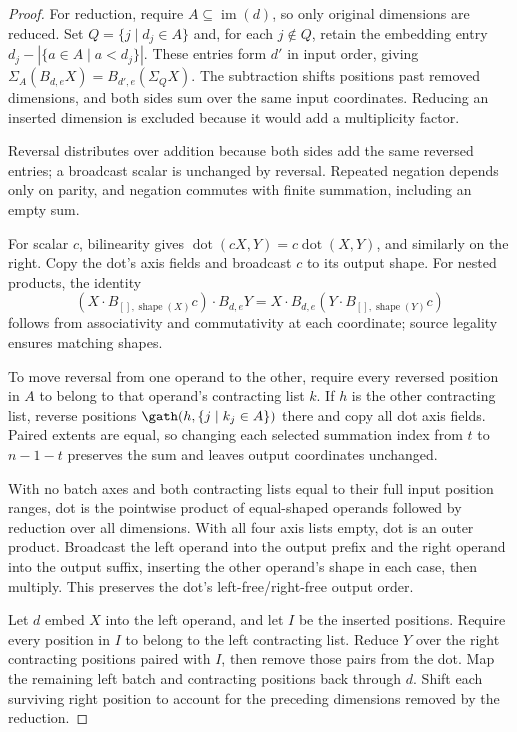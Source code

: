 \begin{proof}
For reduction, require $A\subseteq\operatorname{im}(d)$, so only original
dimensions are reduced. Set $Q=\{j\mid d_j\in A\}$ and, for
each $j\notin Q$, retain the embedding entry
$d_j-|\{a\in A\mid a<d_j\}|$. These entries form $d'$ in input order,
giving $\Sigma_A(B_{d,e}X)=B_{d',e}(\Sigma_QX)$.
The subtraction shifts positions past removed dimensions, and both sides
sum over the same input coordinates. Reducing an inserted dimension is
excluded because it would add a multiplicity factor.

Reversal distributes over addition because both sides add the same
reversed entries; a broadcast scalar is unchanged by reversal.
Repeated negation depends only on parity, and negation commutes with
finite summation, including an empty sum.

For scalar $c$, bilinearity gives
$\operatorname{dot}(cX,Y)=c\operatorname{dot}(X,Y)$, and similarly on the
right. Copy the dot's axis fields and broadcast $c$ to its output shape.
For nested products, the identity
\[
 (X\cdot B_{[],\operatorname{shape}(X)}c)\cdot B_{d,e}Y
 =X\cdot B_{d,e}(Y\cdot B_{[],\operatorname{shape}(Y)}c)
\]
follows from associativity and commutativity at each coordinate;
source legality ensures matching shapes.

To move reversal from one operand to the other, require every reversed
position in $A$ to belong to that operand's contracting list $k$.
If $h$ is the other contracting list, reverse positions
$\gath(h,\{j\mid k_j\in A\})$ there and copy all dot axis fields.
Paired extents are equal, so changing each selected summation index
from $t$ to $n-1-t$ preserves the sum and leaves output coordinates unchanged.

With no batch axes and both contracting lists equal to their full input
position ranges, dot is the pointwise product of equal-shaped operands
followed by reduction over all dimensions.
With all four axis lists empty, dot is an outer product.
Broadcast the left operand into the output prefix and the right operand
into the output suffix, inserting the other operand's shape in each case,
then multiply. This preserves the dot's left-free/right-free output order.

Let $d$ embed $X$ into the left operand, and let $I$ be the inserted
positions. Require every position in $I$ to belong to the left contracting
list. Reduce $Y$ over the right contracting positions paired with $I$,
then remove those pairs from the dot. Map the remaining left batch and
contracting positions back through $d$. Shift each surviving right position
to account for the preceding dimensions removed by the reduction.


\end{proof}
